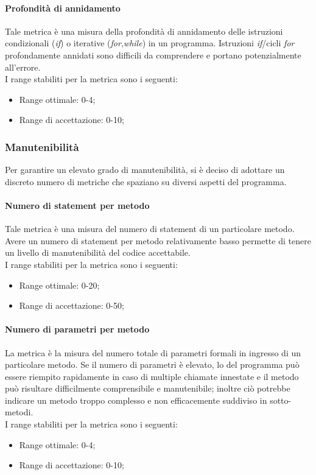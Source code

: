 			\paragraph[Profondità di annidamento]{\hypertarget{pa}{Profondità di annidamento}}
			Tale metrica è una misura della profondità di annidamento delle istruzioni condizionali (\textit{if}) o iterative (\textit{for},\textit{while}) in un programma. Istruzioni \textit{if}/cicli \textit{for} profondamente annidati sono difficili da comprendere e portano potenzialmente all'errore.
			\\I range stabiliti per la metrica sono i seguenti:
			\begin{itemize}
				\item Range ottimale: 0-4;
				\item Range di accettazione: 0-10;
			\end{itemize}

		\subsubsection{Manutenibilità \label{S4}}
		Per garantire un elevato grado di manutenibilità, si è deciso di adottare un discreto numero di metriche che spaziano su diversi aspetti del programma.
			\paragraph[Numero di \gloss{statement} per metodo]{\hypertarget{nsm}{Numero di statement per metodo}}
			Tale metrica è una misura del numero di statement di un particolare metodo. Avere un numero di statement per metodo relativamente basso permette di tenere un livello di manutenibilità del codice accettabile.
			\\I range stabiliti per la metrica sono i seguenti:
			\begin{itemize}
				\item Range ottimale: 0-20;
				\item Range di accettazione: 0-50;
			\end{itemize}
			
			\paragraph[Numero di parametri per metodo]{\hypertarget{npm}{Numero di parametri per metodo}}
			La metrica è la misura del numero totale di parametri formali in ingresso di un particolare metodo. Se il numero di parametri è elevato, lo  del programma può essere riempito rapidamente in caso di multiple chiamate innestate e il metodo può risultare difficilmente comprensibile e manutenibile; inoltre ciò potrebbe indicare un metodo troppo complesso e non efficacemente suddiviso in sotto-metodi.
			\\I range stabiliti per la metrica sono i seguenti:
			\begin{itemize}
				\item Range ottimale: 0-4;
				\item Range di accettazione: 0-10;
			\end{itemize}
			
